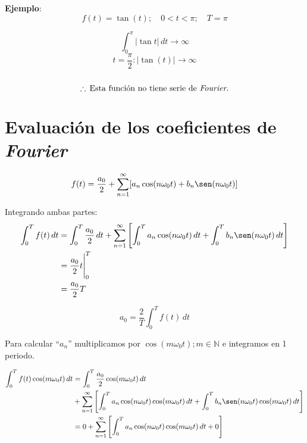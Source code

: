 \textbf{Ejemplo}:
\begin{equation*}
    f(t)=\tan(t); \quad 0<t<\pi; \quad T=\pi
\end{equation*}

\begin{figure}[H]
    \centering
    
\end{figure}

\begin{equation*}
    \int_0^\pi |\tan t|\,dt\rightarrow\infty
\end{equation*}
\begin{equation*}
    t=\frac{\pi}{2}: |\tan(t)|\rightarrow\infty
\end{equation*}
\\
\begin{equation*}
    \therefore\,\text{Esta función no tiene serie de \emph{Fourier}.}
\end{equation*}

\section{Evaluación de los coeficientes de \emph{Fourier}}

\begin{equation*}
    f(t)=\frac{a_0}{2}+
    \sum_{n=1}^{\infty}[a_n\cos(n\omega_0 t)+b_n\sen(n\omega_0 t)]
\end{equation*}

Integrando ambas partes:
\begin{equation*}
\begin{split}
    \int_{0}^{T}f(t)\,dt
        &=\int_{0}^{T}\frac{a_0}{2}\,dt+
          \sum_{n=1}^{\infty}\left[\int_{0}^{T}a_n\cos(n\omega_0 t)\,dt+
          \int_{0}^{T}b_n\sen(n\omega_0 t)\,dt\right]\\
        &=\frac{a_0}{2}t\Biggr|_{0}^{T}\\
        &=\frac{a_0}{2}T\\
\end{split}
\end{equation*}

\begin{equation}
    a_0=\frac{2}{T}\int_{0}^{T}f(t)\,dt
\end{equation}

Para calcular ``$a_n$'' multiplicamos por $\cos(m\omega_0 t); m\in\mathbb{N}$ e
integramos en 1 periodo.

\begin{equation*}
\begin{split}
    \int_{0}^{T}f(t)\cos(m\omega_0 t)\,dt
        &=\int_{0}^{T}\frac{a_0}{2}\cos(m\omega_0 t)\,dt\\
        &+\sum_{n=1}^{\infty}\left[
          \int_{0}^{T}a_n\cos(n\omega_0 t)\cos(m\omega_0 t)\,dt+
          \int_{0}^{T}b_n\sen(n\omega_0 t)\cos(m\omega_0 t)\,dt\right]\\
        &=0+\sum_{n=1}^{\infty}\left[
          \int_{0}^{T}a_n\cos(n\omega_0 t)\cos(m\omega_0 t)\,dt+0\right]\\
\end{split}
\end{equation*}

